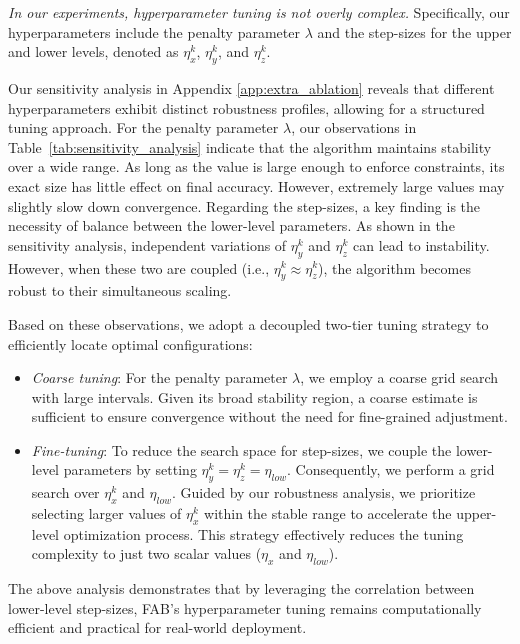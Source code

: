 \documentclass{article}
\theoremstyle{plain}
\theoremstyle{definition}
\theoremstyle{remark}
\begin{document}
\textit{In our experiments, hyperparameter tuning is not overly complex.} Specifically, our hyperparameters include the penalty parameter $\lambda$ and the step-sizes for the upper and lower levels, denoted as $\eta_{x}^{k}$, $\eta_{y}^{k}$, and $\eta_{z}^{k}$.

Our sensitivity analysis in Appendix \ref{app:extra_ablation} reveals that different hyperparameters exhibit distinct robustness profiles, allowing for a structured tuning approach.
For the penalty parameter $\lambda$, our observations in Table~\ref{tab:sensitivity_analysis} indicate that the algorithm maintains stability over a wide range. As long as the value is large enough to enforce constraints, its exact size has little effect on final accuracy. However, extremely large values may slightly slow down convergence.
Regarding the step-sizes, a key finding is the necessity of balance between the lower-level parameters. As shown in the sensitivity analysis, independent variations of $\eta_{y}^{k}$ and $\eta_{z}^{k}$ can lead to instability. However, when these two are coupled (i.e., $\eta_{y}^{k} \approx \eta_{z}^{k}$), the algorithm becomes robust to their simultaneous scaling.

Based on these observations, we adopt a decoupled two-tier tuning strategy to efficiently locate optimal configurations:
\begin{itemize}
    \item \textit{Coarse tuning}: For the penalty parameter $\lambda$, we employ a coarse grid search with large intervals. Given its broad stability region, a coarse estimate is sufficient to ensure convergence without the need for fine-grained adjustment.
    
    \item \textit{Fine-tuning}: To reduce the search space for step-sizes, we couple the lower-level parameters by setting $\eta_{y}^{k} = \eta_{z}^{k} = \eta_{low}$. Consequently, we perform a grid search over $\eta_{x}^{k}$ and $\eta_{low}$. Guided by our robustness analysis, we prioritize selecting larger values of $\eta_{x}^{k}$ within the stable range to accelerate the upper-level optimization process. This strategy effectively reduces the tuning complexity to just two scalar values ($\eta_{x}$ and $\eta_{low}$).
\end{itemize}

The above analysis demonstrates that by leveraging the correlation between lower-level step-sizes, FAB's hyperparameter tuning remains computationally efficient and practical for real-world deployment.
\end{document}
